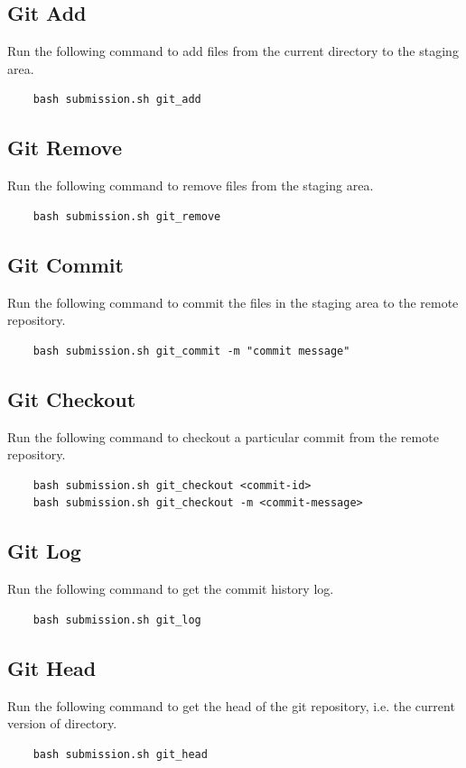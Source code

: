 \documentclass{article}
\begin{document}
\subsection{Git Add}
Run the following command to add files from the current directory to the staging area.
\begin{verbatim}
    bash submission.sh git_add
\end{verbatim}

\subsection{Git Remove}
Run the following command to remove files from the staging area.
\begin{verbatim}
    bash submission.sh git_remove
\end{verbatim}

\subsection{Git Commit}
Run the following command to commit the files in the staging area to the remote repository.
\begin{verbatim}
    bash submission.sh git_commit -m "commit message"
\end{verbatim}

\subsection{Git Checkout}
Run the following command to checkout a particular commit from the remote repository.
\begin{verbatim}
    bash submission.sh git_checkout <commit-id> 
    bash submission.sh git_checkout -m <commit-message>
\end{verbatim}
\newpage

\subsection{Git Log}
Run the following command to get the commit history log.
\begin{verbatim}
    bash submission.sh git_log
\end{verbatim}

\subsection{Git Head}
Run the following command to get the head of the git repository, i.e. the current version of directory.
\begin{verbatim}
    bash submission.sh git_head
\end{verbatim}
\end{document}

